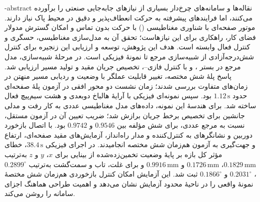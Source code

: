 \fa-abstract{
نقاله‌ها و سامانه‌های چرخ‌دار بسیاری از نیازهای جابه‌جایی صنعتی را برآورده می‌کنند، اما فرایندهای پیشرفته به حرکت انعطاف‌پذیر و دقیق در محیط پاک نیاز دارند. موتور صفحه‌ای با شناوری مغناطیسی () با حرکت بدون تماس و امکان گسترش مدولار فضای کار، راهکاری برای این نیازهاست؛ تحقق آن به مدل‌سازی مغناطیسی، حسگری و کنترل فعال وابسته است. هدف این پژوهش، توسعه و ارزیابی این زنجیره برای کنترل شش‌درجه‌آزادی از شبیه‌سازی مرجع تا نمونهٔ فیزیکی است.
\linebreak در مرحلهٔ شبیه‌سازی، مدل مرجع در بستر ،  و  با کنترل فازی--، تخصیص جریان مقید و تولید مسیر ارزیابی شد. پاسخ پلهٔ شش مختصه، تغییر قابلیت عملگر با وضعیت و ردیابی مسیر منهتن در زمان‌های متفاوت بررسی شدند؛ زمان نشست دو محور افقی در آزمون پلهٔ صفحه‌ای حدود \(1.12\,\mathrm{s}\) بود. سپس نمونه‌ای فیزیکی با آرایهٔ هالباخ دوبعدی و هشت سیم‌پیچ فعال ساخته شد. برای هندسهٔ این نمونه، داده‌های مدل مغناطیسی عددی  به کار رفت و مدلی جانشین برای تخصیص برخط جریان برازش شد؛ ضریب تعیین آن در آزمون مستقل، نسبت به مرجع عددی، برای شش مؤلفه بین \(0.9546\) و \(0.9742\) بود. با اتصال بازخورد دوربین و نشانگرهای  به کنترل‌کننده و مدار راه‌انداز، آزمایش‌های مقید صفحه‌ای، ارتفاع و جهت‌گیری به آزمون هم‌زمان شش مختصه انجامیدند. در اجرای فیزیکی \(38.4\,\mathrm{s}\)، خطای مؤثر کل بازه بر پایهٔ وضعیت تخمین‌زده‌شده از بینایی برای \(x\)، \(y\) و \(z\) به‌ترتیب \(0.1829\,\mathrm{mm}\)، \(0.1726\,\mathrm{mm}\) و \(0.9916\,\mathrm{mm}\) و برای غلت، تاب و سمت‌گشت به‌ترتیب \(0.2899^\circ\)، \(0.2031^\circ\) و \(0.1866^\circ\) ثبت شد. این آزمایش امکان کنترل بازخوردی هم‌زمان شش مختصهٔ نمونهٔ واقعی را در ناحیهٔ محدود آزمایش نشان می‌دهد و اهمیت طراحی هماهنگ اجزای سامانه را روشن می‌کند.
}




